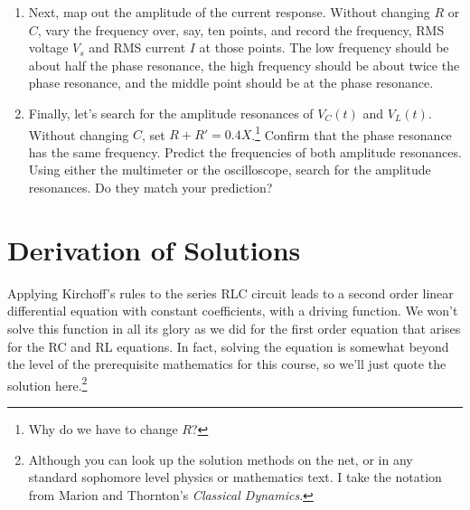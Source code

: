 \documentclass[12pt]{article}
\begin{document}
\begin{enumerate}
\item \label{item:current_response} Next, map out the amplitude of the
  current response.  Without changing $R$ or $C$, vary the frequency
  over, say, ten points, and record the frequency, RMS voltage $V_s$
  and RMS current $I$ at those points.  The low frequency should be
  about half the phase resonance, the high frequency should be about
  twice the phase resonance, and the middle point should be at the
  phase resonance.
\item \label{item:amplitude_resonance} Finally, let's search for the
  amplitude resonances of $V_C(t)$ and $V_L(t)$.  Without changing
  $C$, set $R+R'=0.4X$.\footnote{Why do we have to change $R$?}
  Confirm that the phase resonance has the same frequency.  Predict
  the frequencies of both amplitude resonances.  Using either the
  multimeter or the oscilloscope, search for the amplitude resonances.
  Do they match your prediction?
\end{enumerate}

\appendix

\section{Derivation of Solutions}
\label{sec:solutions}

Applying Kirchoff's rules to the series RLC circuit leads to a second
order linear differential equation with constant coefficients, with a
driving function.  We won't solve this function in all its glory as we
did for the first order equation that arises for the RC and RL
equations.  In fact, solving the equation is somewhat beyond the level
of the prerequisite mathematics for this course, so we'll just quote
the solution here.\footnote{Although you can look up the solution
  methods on the net, or in any standard sophomore level physics or
  mathematics text.  I take the notation from Marion and Thornton's
  \textit{Classical Dynamics}.}
\end{document}
